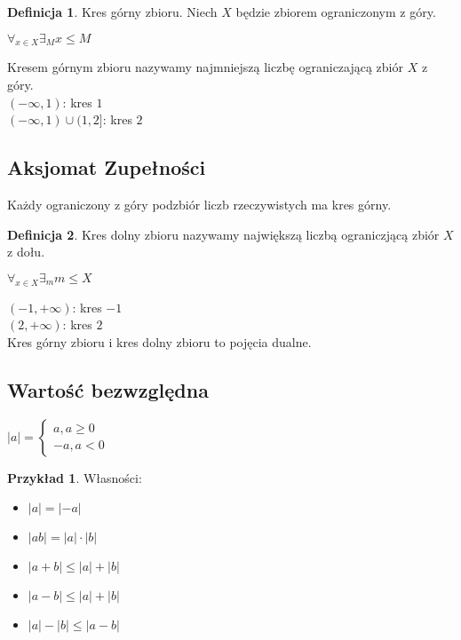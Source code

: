 \documentclass{article}
\theoremstyle{definition}
\newtheorem{de}{Definicja}[subsection]
\theoremstyle{definition}
\theoremstyle{definition}
\newtheorem{pk}{Przykład}[subsection]
\theoremstyle{definition}
\begin{document}
\begin{de}
    Kres górny zbioru. Niech $X$ będzie zbiorem ograniczonym z góry.
    \begin{center}
        $\forall_{x\in X} \exists_M x\leq M$
    \end{center}
    Kresem górnym zbioru nazywamy najmniejszą liczbę ograniczającą zbiór $X$ z góry.\\
    $(-\infty, 1)$: kres $1$\\
    $(-\infty, 1) \cup (1,2]$: kres $2$\\
\end{de}

\subsection{Aksjomat Zupełności}
Każdy ograniczony z góry podzbiór liczb rzeczywistych ma kres górny.\\

\begin{de}
    Kres dolny zbioru nazywamy największą liczbą ograniczjącą zbiór $X$ z dołu.
    \begin{center}
        $\forall_{x\in X} \exists_m m\leq X$
    \end{center}
    $(-1, +\infty)$: kres $-1$\\
    $(2, +\infty)$: kres $2$\\
    Kres górny zbioru i kres dolny zbioru to pojęcia dualne.
\end{de}

\subsection{Wartość bezwzględna}

$|a|=\begin{cases}
    a, a\geq 0\\
    -a, a<0
\end{cases}$

\begin{pk}
    Własności:
    \begin{itemize}
        \item $|a|=|-a|$
        \item $|ab|=|a|\cdot|b|$
        \item $|a+b|\leq|a|+|b|$
        \item $|a-b|\leq|a|+|b|$
        \item $|a|-|b| \leq |a-b|$
    \end{itemize}
\end{pk}
\end{document}
